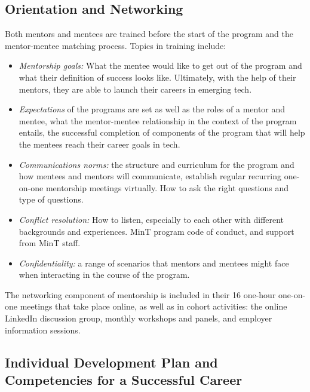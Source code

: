 \subsection{Orientation and Networking}

Both mentors and mentees are trained before the start of the program  and the mentor-mentee matching process. Topics in training include:

\begin{itemize}
    \item \textit{Mentorship goals:} What the mentee would like to get out of the program and what their definition of success looks like. Ultimately, with the help of their mentors, they are able to launch their careers in emerging tech. 

    \item \textit{Expectations} of the programs are set as well as the roles of a mentor and mentee, what the mentor-mentee relationship in the context of the program entails, the successful completion of components of the program that will help the mentees reach their career goals in tech.

    \item \textit{Communications norms:} the structure and curriculum for the program and how mentees and mentors will communicate, establish regular recurring one-on-one mentorship meetings virtually. How to ask the right questions and type of questions.

    \item \textit{Conflict resolution:} How to listen, especially to each other with different backgrounds and experiences. MinT program code of conduct, and support from MinT staff.
    
    \item \textit{Confidentiality:} a range of scenarios that mentors and mentees might face when interacting in the course of the program.
\end{itemize}

The networking component of mentorship is included in their 16 one-hour one-on-one meetings that take place online, as well as in cohort activities: the online LinkedIn discussion group, monthly workshops and panels, and employer information sessions.

\subsection{Individual Development Plan and Competencies for a Successful Career}

